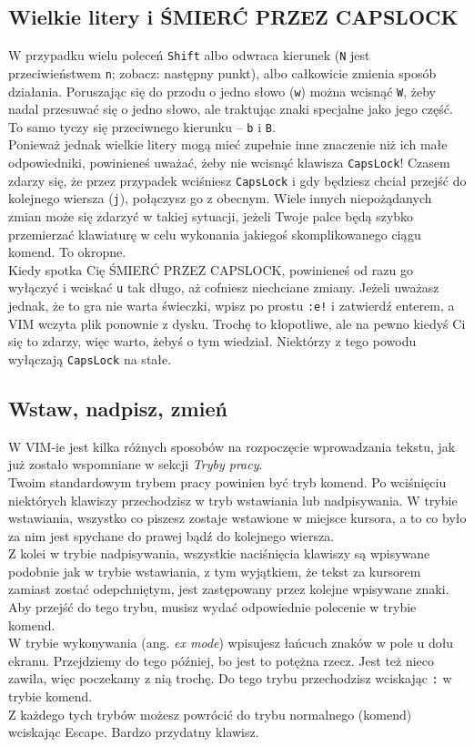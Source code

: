 \documentclass[a4paper,12pt]{article}
\begin{document}
\subsection{Wielkie litery i ŚMIERĆ PRZEZ CAPSLOCK}
W przypadku wielu poleceń {\tt Shift} albo odwraca kierunek ({\tt N} jest przeciwieństwem {\tt n}; zobacz: następny punkt), albo całkowicie zmienia sposób działania. Poruszając się do przodu o jedno słowo ({\tt w}) można wcisnąć {\tt W}, żeby nadal przesuwać się o jedno słowo, ale traktując znaki specjalne jako jego część. To samo tyczy się przeciwnego kierunku – {\tt b} i {\tt B}.\\
Ponieważ jednak wielkie litery mogą mieć zupełnie inne znaczenie niż ich małe odpowiedniki, powinieneś uważać, żeby nie wcisnąć klawisza {\tt CapsLock}! Czasem zdarzy się, że przez przypadek wciśniesz {\tt CapsLock} i gdy będziesz chciał przejść do kolejnego wiersza ({\tt j}), połączysz go z obecnym. Wiele innych niepożądanych zmian może się zdarzyć w takiej sytuacji, jeżeli Twoje palce będą szybko przemierzać klawiaturę w celu wykonania jakiegoś skomplikowanego ciągu komend. To okropne.\\
Kiedy spotka Cię ŚMIERĆ PRZEZ CAPSLOCK, powinieneś od razu go wyłączyć i wciskać {\tt u} tak długo, aż cofniesz niechciane zmiany. Jeżeli uważasz jednak, że to gra nie warta świeczki, wpisz po prostu {\tt :e!} i zatwierdź enterem, a VIM wczyta plik ponownie z dysku. Trochę to kłopotliwe, ale na pewno kiedyś Ci się to zdarzy, więc warto, żebyś o tym wiedział. Niektórzy z tego powodu wyłączają {\tt CapsLock} na stałe.
\subsection{Wstaw, nadpisz, zmień}
W VIM-ie jest kilka różnych sposobów na rozpoczęcie wprowadzania tekstu, jak już zostało wspomniane w sekcji {\it Tryby pracy}.\\
Twoim standardowym trybem pracy powinien być tryb komend. Po wciśnięciu niektórych klawiszy przechodzisz w tryb wstawiania lub nadpisywania. W trybie wstawiania, wszystko co piszesz zostaje wstawione w miejsce kursora, a to co było za nim jest spychane do prawej bądź do kolejnego wiersza.\\
Z kolei w trybie nadpisywania, wszystkie naciśnięcia klawiszy są wpisywane podobnie jak w trybie wstawiania, z tym wyjątkiem, że tekst za kursorem zamiast zostać odepchniętym, jest zastępowany przez kolejne wpisywane znaki. Aby przejść do tego trybu, musisz wydać odpowiednie polecenie w trybie komend.\\
W trybie wykonywania (ang. {\it ex mode}) wpisujesz łańcuch znaków w pole u dołu ekranu. Przejdziemy do tego później, bo jest to potężna rzecz. Jest też nieco zawiła, więc poczekamy z nią trochę. Do tego trybu przechodzisz wciskając {\tt :} w trybie komend.\\
Z każdego tych trybów możesz powrócić do trybu normalnego (komend) wciskając Escape. Bardzo przydatny klawisz.
\end{document}
